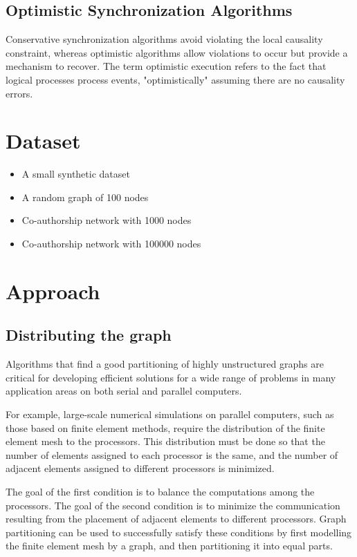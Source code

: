 \documentclass[12pt,a4paper]{article}
\begin{document}
	\subsection{Optimistic Synchronization Algorithms}
	
	Conservative synchronization algorithms avoid violating the local causality constraint, whereas optimistic algorithms allow violations to occur but provide a mechanism to recover. The term optimistic execution refers to the fact that logical processes process events, "optimistically" assuming there are no causality errors.

\section{Dataset}
	\begin{itemize}[nolistsep]
		\item A small synthetic dataset
		\item A random graph of 100 nodes
		\item Co-authorship network with 1000 nodes
		\item Co-authorship network with 100000 nodes
	\end{itemize}

\section{Approach}
	\subsection{Distributing the graph}
Algorithms that find a good partitioning of highly unstructured graphs are critical for developing efficient solutions for a wide range of problems in many application areas on both serial and parallel computers.

For example, large-scale numerical simulations on parallel computers, such as those based on finite element methods, require the distribution of the finite element mesh to the processors. This distribution must be done so that the number of elements assigned to each processor is the same, and the number of adjacent elements assigned to different processors is minimized.

The goal of the first condition is to balance the computations among the processors. The goal of the second condition is to minimize the communication resulting from the placement of adjacent elements to different processors. Graph partitioning can be used to successfully satisfy these conditions by first modelling the finite element mesh by a graph, and then partitioning it into equal parts.
\end{document}
